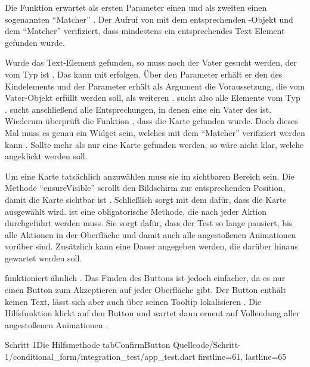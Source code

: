 Die Funktion  erwartet als ersten Parameter einen  und als zweiten einen sogenannten \enquote{Matcher} .
Der Aufruf von  mit dem entsprechenden -Objekt und dem \enquote{Matcher}  verifiziert, dass mindestens ein entsprechendes Text Element gefunden wurde.

Wurde das Text-Element gefunden, so muss noch der Vater gesucht werden, der vom Typ  ist .
Das kann mit  erfolgen. Über den Parameter  erhält er den  des Kindelements und der Parameter  erhält als Argument die Voraussetzung, die vom Vater-Objekt erfüllt werden soll, als weiteren .  sucht also alle Elemente vom Typ .  sucht anschließend alle Entsprechungen, in denen eine  ein Vater des  ist. Wiederum überprüft die Funktion , dass die Karte gefunden wurde. Doch dieses Mal muss es genau ein Widget sein, welches mit dem \enquote{Matcher}  verifiziert werden kann . Sollte mehr als nur eine Karte gefunden werden, so wäre nicht klar, welche angeklickt werden soll.

Um eine Karte tatsächlich anzuwählen muss sie im sichtbaren Bereich sein.
Die Methode \enquote{ensureVisible} scrollt den Bildschirm zur entsprechenden Position, damit die Karte sichtbar ist .
Schließlich sorgt  mit dem   dafür, dass die Karte ausgewählt wird.   ist eine obligatorische Methode, die nach jeder Aktion durchgeführt werden muss. Sie sorgt dafür, dass der Test so lange pausiert, bis alle Aktionen in der Oberfläche und damit auch alle angestoßenen Animationen vorüber sind. Zusätzlich kann eine Dauer angegeben werden, die darüber hinaus gewartet werden soll. 

 funktioniert ähnlich \Lst{\ref{lst:Schritt1HilfsmethodeTabSelectionCard}}.
Das Finden des Buttons ist jedoch einfacher, da es nur einen Button zum Akzeptieren auf jeder Oberfläche gibt.
Der Button enthält keinen Text, lässt sich aber auch über seinen Tooltip lokalisieren .
Die Hilfsfunktion klickt auf den Button  und wartet dann erneut auf Vollendung aller angestoßenen Animationen .

\begin{alexlisting}{Schritt 1}{Die Hilfsmethode tabConfirmButton}
  {Quellcode/Schritt-1/conditional_form/integration_test/app_test.dart}
  {firstline=61, lastline=65}
  \label{lst:Schritt1HilfsmethodeTabSelectionCard}
\end{alexlisting}

